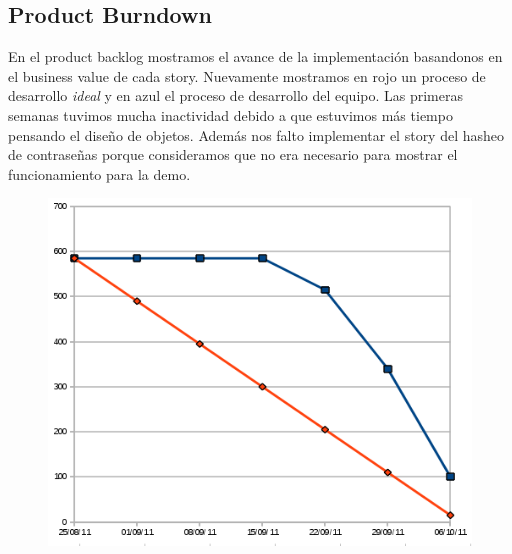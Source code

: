 \subsection*{Product Burndown}

En el product backlog mostramos el avance de la implementaci\'on basandonos en el business value de cada story.
Nuevamente mostramos en rojo un proceso de desarrollo \emph{ideal} y en azul el proceso de desarrollo del equipo.
Las primeras semanas tuvimos mucha inactividad debido a que estuvimos m\'as tiempo pensando el dise\~no de objetos.
Adem\'as nos falto implementar el story del hasheo de contrase\~nas porque consideramos que no era necesario para mostrar el
funcionamiento para la demo.

\begin{figure}[H]
\begin{center}
 \includegraphics[scale=0.6]{burn1.png}
\end{center}
\end{figure}
